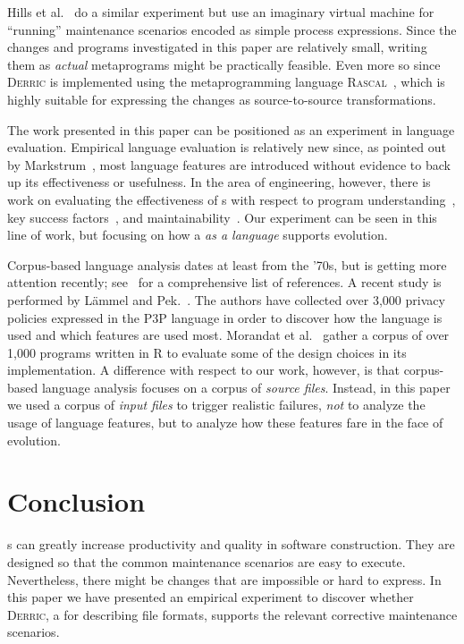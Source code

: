 \documentclass[a4paper]{llncs}
\def\derric{\textsc{Derric}\xspace}
\newcommand{\DSL}{\textsmaller{DSL}\xspace}
\begin{document}
Hills et al.~\cite{HillsKlintvdStormVinju2011} do a similar experiment but use an imaginary virtual machine for ``running'' maintenance scenarios encoded as simple process expressions.
Since the changes and programs investigated in this paper are relatively small, writing them as \textit{actual} metaprograms might be practically feasible. 
Even more so since \derric is implemented using the metaprogramming language \textsc{Rascal}~\cite{Rascal}, which is highly suitable for expressing the changes as source-to-source transformations. 

The work presented in this paper can be positioned as an experiment in language evaluation.
Empirical language evaluation is relatively new since, as pointed out by Markstrum~\cite{claims}, most language features are introduced without evidence to back up its effectiveness or usefulness.
In the area of \DSL engineering, however, there is work on evaluating the effectiveness of \DSL{}s with respect to program understanding~\cite{MernikEtAl05}, key success factors~\cite{HermansEtAl09}, and maintainability~\cite{KlintEtAl10}. 
Our experiment can be seen in this line of work, but focusing on how a \DSL \textit{as a language} supports evolution.

Corpus-based language analysis dates at least from the '70s, but is getting more attention recently; see~\cite{favre2011empirical} for a comprehensive list of references. 
A recent study is performed by L\"{a}mmel and Pek.~\cite{p3p}. 
The authors have collected over 3,000 privacy policies expressed in the P3P language in order to discover how the language is used and which features are used most.
Morandat et al.~\cite{rlang} gather a corpus of over 1,000 programs written in R to evaluate some of the design choices in its implementation.
A difference with respect to our work, however, is that corpus-based language analysis focuses on a corpus of \textit{source files}.
Instead, in this paper we used a corpus of \textit{input files} to trigger realistic failures, \textit{not} to analyze the usage of language features, but to analyze how these features fare in the face of evolution.

\section{Conclusion\label{sect:conclusion}}

\noindent
\DSL{}s can greatly increase productivity and quality in software construction. 
They are designed so that the common maintenance scenarios are easy to execute.
Nevertheless, there might be changes that are impossible or hard to express.
In this paper we have presented an empirical experiment to discover whether \derric, a \DSL for describing file formats, supports the relevant corrective maintenance scenarios.
\end{document}
